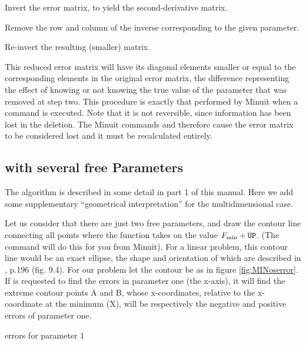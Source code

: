 \begin{OL}
\item Invert the error matrix, to yield the second-derivative matrix.
\item Remove the row and column of the inverse corresponding to the 
      given parameter.
\item Re-invert the resulting (smaller) matrix.
\end{OL}
 
This reduced error matrix will have its diagonal elements smaller or 
equal to the corresponding elements in the original error matrix, the 
difference representing the effect of knowing or not knowing the 
true value of the parameter that was removed at step two. This 
procedure is exactly that performed by Minuit when a  command 
is executed. Note that it is not reversible, since information has 
been lost in the deletion. 
The Minuit commands  and 
 therefore cause the error matrix to be considered lost and 
it must be recalculated entirely.
 
\subsection{\protect{} with several free Parameters}
 
The  algorithm is described in some detail in part 1 of this manual.
Here we add some supplementary 
``geometrical interpretation'' for the multidimensional case.
 
Let us consider that there are just two free parameters, and draw 
the contour line connecting all points where the function takes on 
the value $F_{\mathrm{min}} + \mbox{\tt UP}$. 
(The  command will do this for you from Minuit). 
For a linear problem, this contour line would be an 
exact ellipse, the shape and orientation of which are described in 
\cite{bib-EADIE}, p.196 (fig. 9.4). 
For our problem let the contour be as in figure \ref{fig:MINoserror}.
If  is requested to find the errors in parameter 
one (the x-axis), it will find the extreme contour points A and B, 
whose x-coordinates, relative to the x-coordinate at the minimum 
(X), will be respectively the negative and positive  errors of 
parameter one.
 
\begin{Fighere}
\begin{center}
\mbox{}
\end{center}
\caption{\protect{} errors for parameter 1}
\label{fig:MINoserror}
\end{Fighere}
 
